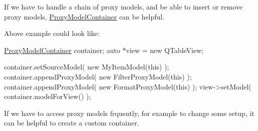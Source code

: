 If we have to handle a chain of proxy models, and be able to insert or remove proxy models, \hyperlink{class_mdt_1_1_item_model_1_1_proxy_model_container}{Proxy\+Model\+Container} can be helpful.

Above example could look like\+: 
\begin{DoxyCode}
\hyperlink{class_mdt_1_1_item_model_1_1_proxy_model_container_acef8f95b42382752a454b607bcf6d9b0}{ProxyModelContainer} container;
\textcolor{keyword}{auto} *view = \textcolor{keyword}{new} QTableView;

container.setSourceModel( \textcolor{keyword}{new} MyItemModel(\textcolor{keyword}{this}) );
container.appendProxyModel( \textcolor{keyword}{new} FilterProxyModel(\textcolor{keyword}{this}) );
container.appendProxyModel( \textcolor{keyword}{new} FormatProxyModel(\textcolor{keyword}{this}) );
view->setModel( container.modelForView() );
\end{DoxyCode}


If we have to access proxy models frquently, for example to change some setup, it can be helpful to create a custom container.


